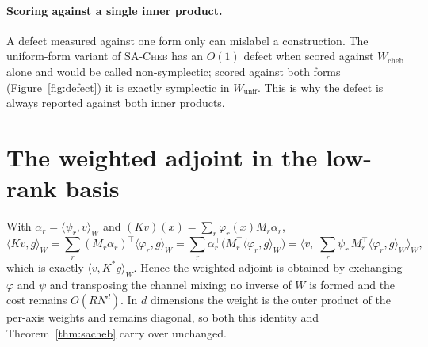 \documentclass[11pt]{article}
\theoremstyle{definition}
\theoremstyle{remark}
\newcommand{\iprod}[2]{\langle #1, #2 \rangle}
\newcommand{\Wc}{W_{\mathrm{cheb}}}
\newcommand{\Wu}{W_{\mathrm{unif}}}
\newcommand{\sacheb}{\textsc{SA-Cheb}}
\begin{document}
\paragraph{Scoring against a single inner product.} A defect measured against one
form only can mislabel a construction. The uniform-form variant of \sacheb{} has an
$O(1)$ defect when scored against $\Wc$ alone and would be called non-symplectic;
scored against both forms (Figure~\ref{fig:defect}) it is exactly symplectic in
$\Wu$. This is why the defect is always reported against both inner products.

\section{The weighted adjoint in the low-rank basis}
\label{app:lowrank}

With $\alpha_r=\iprod{\psi_r}{v}_W$ and $(Kv)(x)=\sum_r\varphi_r(x)M_r\alpha_r$,
\[
\iprod{Kv}{g}_W
=\sum_r (M_r\alpha_r)^{\top}\iprod{\varphi_r}{g}_W
=\sum_r \alpha_r^{\top}\big(M_r^{\top}\iprod{\varphi_r}{g}_W\big)
=\Big\langle v,\;\sum_r \psi_r\,M_r^{\top}\iprod{\varphi_r}{g}_W\Big\rangle_W,
\]
which is exactly $\iprod{v}{K^{*}g}_W$. Hence the weighted adjoint is obtained by
exchanging $\varphi$ and $\psi$ and transposing the channel mixing; no inverse of
$W$ is formed and the cost remains $O(RN^d)$. In $d$ dimensions the weight is the
outer product of the per-axis weights and remains diagonal, so both this identity
and Theorem~\ref{thm:sacheb} carry over unchanged.
\end{document}
